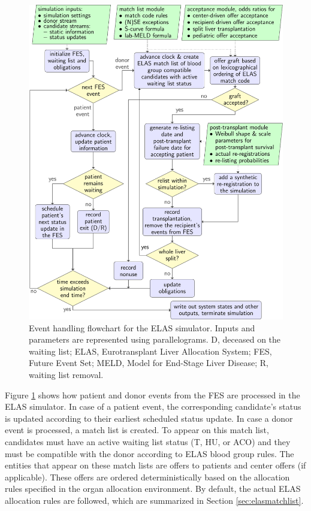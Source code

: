 \documentclass[11pt,twoside,]{book}
\begin{document}
\begin{figure}[h]

{\centering \includegraphics[width=0.9\linewidth]{figures/ch5//fig1-flowchart_liver_allocation} 

}

\caption{Event handling flowchart for the ELAS simulator. Inputs and parameters are represented using parallelograms. D, deceased on the waiting list; ELAS, Eurotransplant Liver Allocation System; FES, Future Event Set; MELD, Model for End-Stage Liver Disease; R, waiting list removal.}\label{fig:ch5fig1}
\end{figure}

Figure \ref{fig:ch5fig1} shows how patient and donor events from the
FES are processed in the ELAS simulator. In case of a patient event, the
corresponding candidate's status is updated according to their earliest
scheduled status update. In case a donor event is processed, a match list
is created. To appear
on this match list, candidates must have an active waiting list status
(T, HU, or ACO) and they must be compatible with the donor according to ELAS
blood group rules. The entities that appear on these match lists are offers
to patients and center offers (if applicable). These offers are ordered deterministically based on the allocation rules specified in the organ allocation
environment. By default, the actual ELAS allocation rules are followed,
which are summarized in Section \ref{sec:elasmatchlist}.
\end{document}
